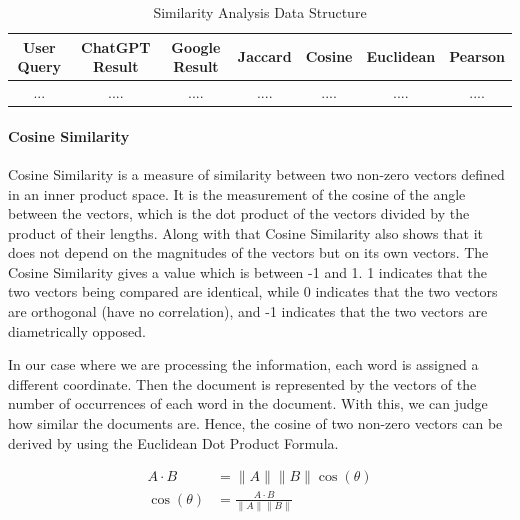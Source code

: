\documentclass[50pt]{usiinfbachelorproject}
\begin{document}
\begin{table}[H]
  \centering
  \begin{tabular}{|c|c|c|c|c|c|c|}
    \hline
    User Query & ChatGPT Result & Google Result & Jaccard & Cosine & Euclidean & Pearson\\
    \hline
    \hline
    ... & .... & .... & .... & .... & .... & .... \\
    \hline
  \end{tabular}
  \caption{Similarity Analysis Data Structure}
  \label{tab:similarity_analysis_data_structure}
\end{table}
\paragraph{Cosine Similarity}
Cosine Similarity \cite{dehak2010cosine} is a measure of similarity between two non-zero vectors defined in an inner product space. It is the measurement of the cosine of the angle between the vectors, which is the dot product of the vectors divided by the product of their lengths. Along with that Cosine Similarity also shows that it does not depend on the magnitudes of the vectors but on its own vectors. The Cosine Similarity gives a value which is between -1 and 1. 1 indicates that the two vectors being compared are identical, while 0 indicates that the two vectors are orthogonal (have no correlation), and -1 indicates that the two vectors are diametrically opposed.

In our case where we are processing the information, each word is assigned a different coordinate. Then the document is represented by the vectors of the number of occurrences of each word in the document. With this, we can judge how similar the documents are. Hence, the cosine of two non-zero vectors can be derived by using the Euclidean Dot Product Formula.

\begin{align}
  A \cdot B &= \|A\| \|B\| \cos(\theta) \\
  \cos(\theta) &= \frac{A \cdot B}{\|A\| \|B\|}
\end{align}
\end{document}
